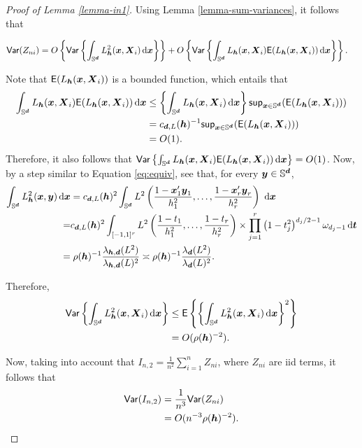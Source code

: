 \documentclass[oneside,11pt]{article}
\begin{document}
\begin{proof}[Proof of Lemma \ref{lemma-in1}]
Using Lemma \ref{lemma-sum-variances}, it follows that

\begin{align*}
    \mathsf{Var}(Z_{ni}) &= O \lrb{\mathsf{Var} \lrb{\int_{\Sr} L_{\bh}^2 (\bx,\bX_i)  \,\rd \bx}} + O \lrb{\mathsf{Var} \lrb{\int_{\Sr} L_{\bh}  (\bx,\bX_i) \mathsf{E} (L_{\bh}  (\bx,\bX_i))  \,\rd \bx}}.
\end{align*}

Note that $\mathsf{E} (L_{\bh}  (\bx,\bX_i))$ is a bounded function, which entails that
\begin{align*}
    \int_{\Sr} L_{\bh}  (\bx,\bX_i) \mathsf{E} (L_{\bh}  (\bx,\bX_i))  \,\rd \bx &\le \lrb{\int_{\Sr} L_{\bh}  (\bx,\bX_i)  \,\rd \bx} \mathsf{sup}_{\bx \in \Sr} (\mathsf{E} (L_{\bh}  (\bx,\bX_i))) \\
    &= c_{\bd,L}(\bh)^{-1} \mathsf{sup}_{\bx \in \Sr} (\mathsf{E} (L_{\bh}  (\bx,\bX_i))) \\
    &= O(1).
\end{align*}
Therefore, it also follows that $\mathsf{Var} \lrb{\int_{\Sr} L_{\bh}  (\bx,\bX_i) \mathsf{E} (L_{\bh}  (\bx,\bX_i))  \,\rd \bx} = O(1)$. Now, by a step similar to Equation \ref{eq:equiv}, see that, for every $\by \in \Sr$,
\begin{align*}
    \int_{\Sr} L_{\bh}^2 (\bx,\by)  \,\rd \bx &= c_{\bd,L}(\bh)^{2} \int_{\Sr}L^2 \lrp{\frac{1-\bx_1' \by_1}{h_1^2},\ldots, \frac{1-\bx_r' \by_r}{h_r^2}}\, \,\rd \bx \nonumber \\
    =& c_{\bd,L}(\bh)^{2} \int_{[-1,1]^r}L^2 \lrp{\frac{1-t_1}{h_1^2},\ldots, \frac{1-t_r}{h_r^2}}\times \prod_{j=1}^r \left(1-t_j^2\right)^{d_j/2-1}\om{d_j-1}\,\rd \bt   \nonumber \\
    =&\; \rho(\bh)^{-1} \frac{\lambda_{\bh,\bd}(L^2)}{\lambda_{\bh,\bd}(L)^2} \asymp \rho(\bh)^{-1} \frac{\lambda_{\bd}(L^2)}{\lambda_{\bd}(L)^2}.
\end{align*}

Therefore,
\begin{align*}
    \mathsf{Var} \lrb{\int_{\Sr} L_{\bh}^2 (\bx,\bX_i)  \,\rd \bx} &\le \mathsf{E} \lrb{\lrb{\int_{\Sr} L_{\bh}^2 (\bx,\bX_i)  \,\rd \bx}^2} \\
    &= O(\rho(\bh)^{-2}).
\end{align*}

Now, taking into account that $I_{n,2} = \frac{1}{n^2} \sum_{i=1}^{n} Z_{ni}$, where $Z_{ni}$ are iid terms, it follows that
\begin{align*}
    \mathsf{Var} (I_{n,2}) &= \frac{1}{n^3} \mathsf{Var} (Z_{ni}) \\
    &= O(n^{-3} \rho(\bh)^{-2}).
\end{align*}


\end{proof}
\end{document}
